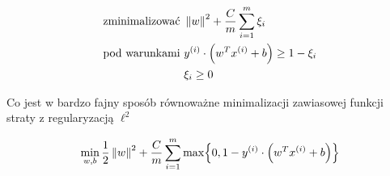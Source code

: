 \begin{align*}
	\text{zminimalizować } & \left\Vert w \right\Vert^2 + \frac{C}{m} \sum_{i=1}^m \xi_i         \\
	\text{pod warunkami }  & y^{(i)} \cdot \left(w^T x^{(i)} + b\right) \geq 1 - \xi_i \\
	                       & \xi_i \geq 0
\end{align*}

Co jest w bardzo fajny sposób równoważne minimalizacji zawiasowej funkcji straty z regularyzacją \( \ell^2 \)

\[
	\min_{w, b} \frac{1}{2} \norm{w}^2 + \frac{C}{m}\sum_{i=1}^m \max\braces{0, 1 - y^{(i)} \cdot \pars{w^T x^{(i)} + b}}
\]
